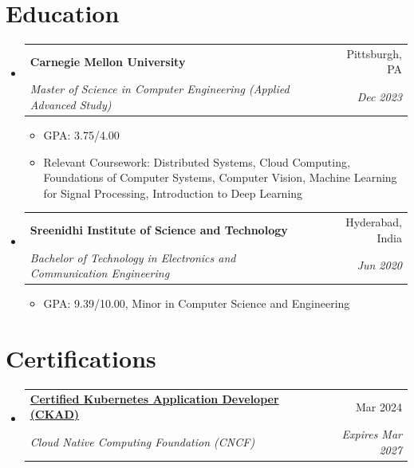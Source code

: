 \documentclass[letterpaper,11pt]{article}
\makeatletter
\newcommand{\resumeItem}[1]{
  \item\small{
    {#1\vspace{-2pt}}
  }
}
\newcommand{\resumeSubheading}[4]{
  \vspace{-2pt}\item
    \begin{tabular*}{0.97\textwidth}[t]{l@{\extracolsep{\fill}}r}
      \textbf{#1} & #2 \\
      \textit{\small#3} & \textit{\small #4} \\
    \end{tabular*}\vspace{-7pt}
}
\newcommand{\resumeSubHeadingListStart}{\begin{itemize}[leftmargin=0.15in, label={}]}
\newcommand{\resumeSubHeadingListEnd}{\end{itemize}}
\newcommand{\resumeItemListStart}{\begin{itemize}[leftmargin=0.15in]}
\newcommand{\resumeItemListEnd}{\end{itemize}\vspace{-5pt}}
\makeatother
\begin{document}
\section{Education}
  \resumeSubHeadingListStart
    \resumeSubheading
      {Carnegie Mellon University}{Pittsburgh, PA}
      {Master of Science in Computer Engineering (Applied Advanced Study)}{Dec 2023}
      \resumeItemListStart
        \resumeItem{GPA: 3.75/4.00}
        \resumeItem{Relevant Coursework: Distributed Systems, Cloud Computing, Foundations of Computer Systems, Computer Vision, Machine Learning for Signal Processing, Introduction to Deep Learning}
      \resumeItemListEnd
    \resumeSubheading
      {Sreenidhi Institute of Science and Technology}{Hyderabad, India}
      {Bachelor of Technology in Electronics and Communication Engineering}{Jun 2020}
      \resumeItemListStart
        \resumeItem{GPA: 9.39/10.00, Minor in Computer Science and Engineering}
      \resumeItemListEnd
  \resumeSubHeadingListEnd

\section{Certifications}
  \resumeSubHeadingListStart
    \resumeSubheading
      {\href{https://ti-user-certificates.s3.amazonaws.com/e0df7fbf-a057-42af-8a1f-590912be5460/d7e3ef2d-1761-4c26-9075-70ef6c6f4dee-nihar-gaddam-f174fb86-72a4-4efc-908e-6a1d069aaa11-certificate.pdf}{Certified Kubernetes Application Developer (CKAD)}}{Mar 2024}
      {Cloud Native Computing Foundation (CNCF)}{Expires Mar 2027}
  \resumeSubHeadingListEnd
\end{document}
